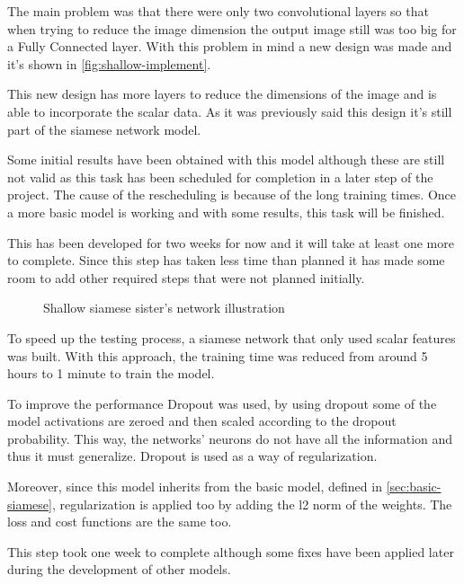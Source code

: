 The main problem was that there were only two convolutional layers so that when trying to reduce
the image dimension the output image still was too big for a Fully Connected layer. With this
problem in mind a new design was made and it's shown in \autoref{fig:shallow-implement}.

This new design has more layers to reduce the dimensions of the image and is able to 
incorporate the scalar data. As it was previously said this design it's still part of the
siamese network model.

Some initial results have been obtained with this model although these are still not valid as
this task has been scheduled for completion in a later step of the project. The cause of the 
rescheduling is because of the long training times. Once a more basic model is working and
with some results, this task will be finished.

This has been developed for two weeks for now and it will take at least one more to complete.
Since this step has taken less time than planned it has made some room to add other required
steps that were not planned initially.

\begin{figure}
  \centering
  
  \caption{Shallow siamese sister's network illustration \label{fig:shallow-implement}}
\end{figure}


\label{sec:scalar-only}

To speed up the testing process, a siamese network that only used scalar features 
was built. With this approach, the training time was reduced from around 5 hours 
to 1 minute to train the model. 

To improve the performance Dropout \cite{neural:dropout} was used, by using dropout some 
of the model activations are zeroed and then scaled according to the dropout probability. 
This way, the networks' neurons do not have all the information and thus it must generalize. 
Dropout is used as a way of regularization. 

Moreover, since this model inherits from the basic model, defined in \autoref{sec:basic-siamese}, 
regularization is applied too by adding the l2 norm of the weights. The loss and
cost functions are the same too.

This step took one week to complete although some fixes have been applied later during the
development of other models.

